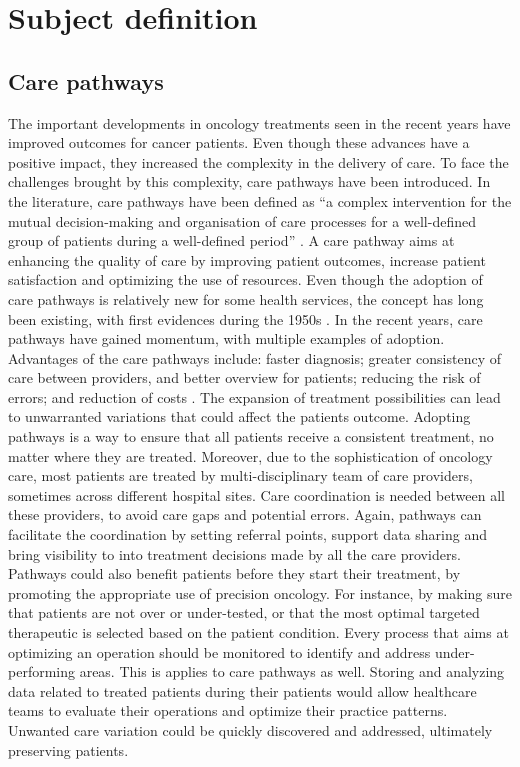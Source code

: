 \section{Subject definition}

\subsection{Care pathways}

The important developments in oncology treatments seen in the recent years have
improved outcomes for cancer patients. Even though these advances have a
positive impact, they increased the complexity in the delivery of care. To face
the challenges brought by this complexity, care pathways have been introduced.
In the literature, care pathways have been defined as ``a complex intervention
for the mutual decision-making and organisation of care processes for a
well-defined group of patients during a well-defined period''
\cite{vanhaecht_impact_2007}. A care pathway aims at enhancing the quality of
care by improving patient outcomes, increase patient satisfaction and optimizing
the use of resources. Even though the adoption of care pathways is relatively
new for some health services, the concept has long been existing, with first
evidences during the 1950s \cite{schrijvers_care_2012}. In the recent years,
care pathways have gained momentum, with multiple examples of adoption.
Advantages of the care pathways include: faster diagnosis; greater consistency
of care between providers, and better overview for patients; reducing the risk
of errors; and reduction of costs \cite{schrijvers_care_2012}.
The expansion of treatment possibilities can lead to unwarranted variations that
could affect the patients outcome. Adopting pathways is a way to ensure that all
patients receive a consistent treatment, no matter where they are treated.
Moreover, due to the sophistication of oncology care, most patients are treated
by multi-disciplinary team of care providers, sometimes across different
hospital sites. Care coordination is needed between all these providers, to
avoid care gaps and potential errors. Again, pathways can facilitate the
coordination by setting referral points, support data sharing and bring
visibility to into treatment decisions made by all the care providers.
Pathways could also benefit patients before they start their treatment, by
promoting the appropriate use of precision oncology. For instance, by making
sure that patients are not over or under-tested, or that the most optimal
targeted therapeutic is selected based on the patient condition.
Every process that aims at optimizing an operation should be monitored
to identify and address under-performing areas. This is applies to care
pathways as well. Storing and analyzing data related to treated patients during
their patients would allow healthcare teams to evaluate their operations and
optimize their practice patterns. Unwanted care variation could be quickly
discovered and addressed, ultimately preserving patients.

